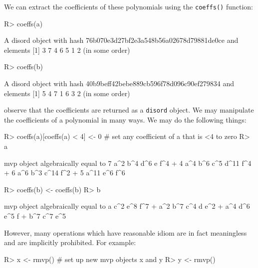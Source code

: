 \documentclass{article}
\begin{document}
We can extract the coefficients of these polynomials using the
{\tt coeffs()} function:

\begin{Schunk}
\begin{Sinput}
R> coeffs(a)
\end{Sinput}
\begin{Soutput}
A disord object with hash 76b070e3d27bf2e3a548b56a02678d79881de0ce and elements
[1] 3 7 4 6 5 1 2
(in some order)
\end{Soutput}
\begin{Sinput}
R> coeffs(b)
\end{Sinput}
\begin{Soutput}
A disord object with hash 40b9beff42bebe889cb596f78d096c90ef279834 and elements
[1] 5 4 7 1 6 3 2
(in some order)
\end{Soutput}
\end{Schunk}

observe that the coefficients are returned as a {\tt disord}  object.
We may manipulate the coefficients of a polynomial in many ways.  We
may do the following things:

\begin{Schunk}
\begin{Sinput}
R> coeffs(a)[coeffs(a) < 4] <- 0   # set any coefficient of a that is <4 to zero
R> a
\end{Sinput}
\begin{Soutput}
mvp object algebraically equal to
7 a^2 b^4 d^6 e f^4  +  4 a^4 b^6 c^5 d^11 f^4  +  6 a^6 b^3 c^14 f^2  +
5 a^11 e^6 f^6
\end{Soutput}
\begin{Sinput}
R> coeffs(b) <- coeffs(b)%
R> b
\end{Sinput}
\begin{Soutput}
mvp object algebraically equal to
a c^2 e^8 f^7  +  a^2 b^7 c^4 d e^2  +  a^4 d^6 e^5 f  +  b^7 c^7 e^5
\end{Soutput}
\end{Schunk}

However, many operations which have reasonable idiom are in fact
meaningless and are implicitly prohibited.  For example:


\begin{Schunk}
\begin{Sinput}
R> x <- rmvp()     # set up new mvp objects x and y
R> y <- rmvp()
\end{Sinput}
\end{Schunk}
\end{document}
